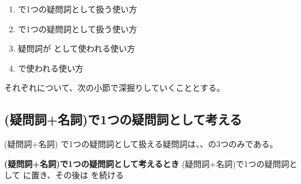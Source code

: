     \begin{enumerate}[itemsep=0.8em]
        \item {}で1つの疑問詞として扱う使い方
        \item {}で1つの疑問詞として扱う使い方
        \item 疑問詞が として使われる使い方
        \item {}で使われる使い方
    \end{enumerate}

    それぞれについて、次の小節で深掘りしていくこととする。
\newpage

\subsection{(疑問詞+名詞)で1つの疑問詞として考える}
    (疑問詞+名詞) で1つの疑問詞として扱える疑問詞は、、の3つのみである。

    \begin{theorembox}{\textbf{(疑問詞+名詞)で1つの疑問詞として考えるとき}}
        (疑問詞+名詞)で1つの疑問詞として  に置き、その後は  を続ける
    \end{theorembox}
    \vspace{1em}

